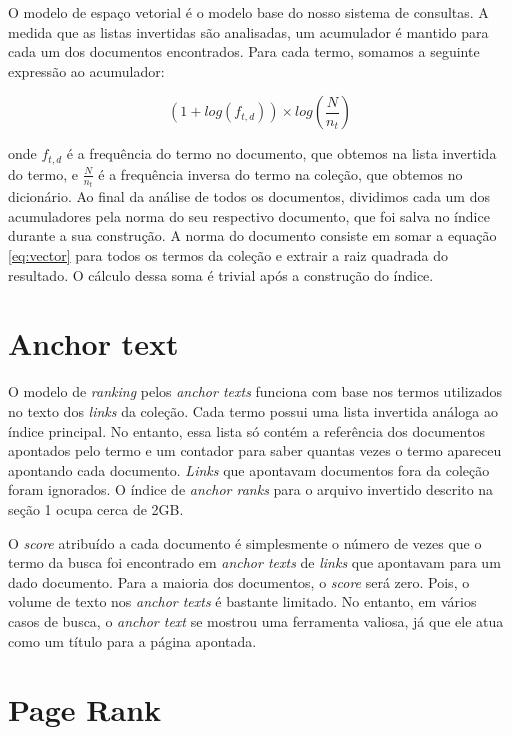 \documentclass{article}
\begin{document}
O modelo de espaço vetorial é o modelo base do nosso sistema de consultas. A medida que as
listas invertidas são analisadas, um acumulador é mantido para cada um dos documentos 
encontrados. Para cada termo, somamos a seguinte expressão ao acumulador:

\begin{equation}
(1 + log(f_{t,d})) \times log(\frac{N}{n_t})
\label{eq:vector}
\end{equation}

onde $ f_{t,d} $ é a frequência do termo no documento, que obtemos na lista invertida do termo, e
$ \frac{N}{n_t} $ é a frequência inversa do termo na coleção, que obtemos no dicionário. Ao
final da análise de todos os documentos, dividimos cada um dos acumuladores pela norma do
seu respectivo documento, que foi salva no índice durante a sua construção. A norma do documento consiste
em somar a equação \ref{eq:vector} para todos os termos da coleção e extrair
a raiz quadrada do resultado. O cálculo dessa soma é trivial após a construção do índice.

\section{Anchor text}

O modelo de \textit{ranking} pelos \textit{anchor texts} funciona com base nos termos
utilizados no texto dos \textit{links} da coleção. Cada termo possui uma lista invertida análoga ao índice principal.
No entanto, essa lista só contém a referência dos documentos apontados pelo 
termo e um contador para saber quantas vezes o termo apareceu apontando cada documento.
\textit{Links} que apontavam documentos fora da coleção foram ignorados. 
O índice de \textit{anchor ranks} para o arquivo invertido descrito na seção 1 ocupa cerca de 2GB.

O \textit{score} atribuído a cada documento é simplesmente o número de vezes que o termo da busca 
foi encontrado em \textit{anchor texts} de \textit{links} que apontavam para um dado documento. 
Para a maioria dos documentos, o \textit{score} será zero. Pois, o volume de texto nos \textit{anchor texts}
é bastante limitado. No entanto, em vários casos de busca, o \textit{anchor text} se mostrou uma 
ferramenta valiosa, já que ele atua como um título para a página apontada.

\section{Page Rank}
\end{document}
